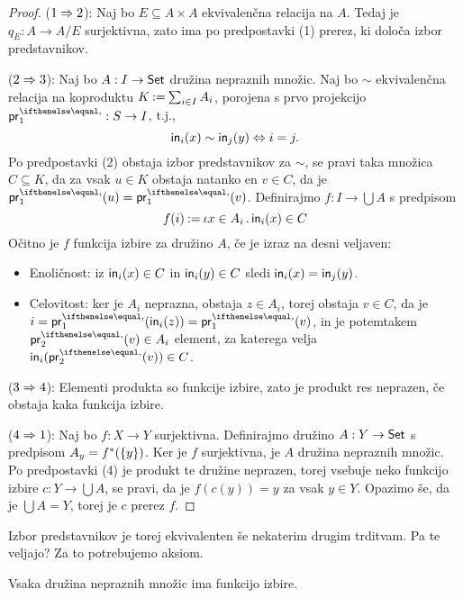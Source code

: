\begin{proof}
  ($1 \lthen 2$):
  Naj bo $E \subseteq A \times A$ ekvivalenčna relacija na $A$. Tedaj je $q_E : A \to A/E$
  surjektivna, zato ima po predpostavki (1) prerez, ki določa izbor predstavnikov.

  ($2 \lthen 3$):
  Naj bo $A : I \to \Set$ družina nepraznih množic. Naj bo $\sim$ ekvivalenčna relacija
  na koproduktu $K \defeq \sum_{i \in I} A_i$, porojena s prvo projekcijo $\fst : S \to I$, t.j.,
  \begin{equation*}
    \inj[i](x) \sim \inj[j](y) \liff i = j.
  \end{equation*}
  Po predpostavki (2) obstaja izbor predstavnikov za $\sim$, se pravi taka množica $C \subseteq K$, da
  za vsak $u \in K$ obstaja natanko en $v \in C$, da je $\fst(u) = \fst(v)$. Definirajmo $f : I \to
  \bigcup A$ s predpisom
  \begin{equation*}
    f(i) \defeq \descr{x \in A_i} \inj[i](x) \in C
  \end{equation*}
  Očitno je $f$ funkcija izbire za družino $A$, če je izraz na desni veljaven:
  \begin{itemize}
  \item Enoličnost: iz $\inj[i](x) \in C$ in $\inj[i](y) \in C$ sledi $\inj[i](x) = \inj[j](y)$.
  \item Celovitost: ker je $A_i$ neprazna, obstaja $z \in A_i$, torej obstaja $v \in C$, da je
    $i = \fst(\inj[i](z)) = \fst(v)$, in je potemtakem $\snd(v) \in A_i$ element, za katerega velja
    $\inj[i](\snd(v)) \in C$.
  \end{itemize}

  ($3 \lthen 4$):
  Elementi produkta so funkcije izbire, zato je produkt res neprazen, če obstaja
  kaka funkcija izbire.

  ($4 \lthen 1$):
  Naj bo $f : X \to Y$ surjektivna. Definirajmo družino $A : Y \to \Set$ s
  predpisom $A_y = \invimg{f}(\set{y})$. Ker je $f$ surjektivna, je $A$ družina nepraznih
  množic. Po predpostavki (4) je produkt te družine neprazen, torej vsebuje neko
  funkcijo izbire $c : Y \to \bigcup A$, se pravi, da je $f(c(y)) = y$ za vsak $y \in Y$.
  Opazimo še, da je $\bigcup A = Y$, torej je $c$ prerez $f$.
\end{proof}

Izbor predstavnikov je torej ekvivalenten še nekaterim drugim trditvam. Pa te veljajo? Za
to potrebujemo aksiom.

\begin{aksiom}
  Vsaka družina nepraznih množic ima funkcijo izbire.
\end{aksiom}

